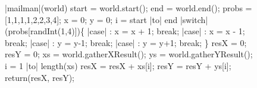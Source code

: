 \documentclass[11pt]{article}
\begin{document}
\begin{figure}[h]
\begin{program}
\PROC |mailman|(world) \BODY
	start = world.start();
	end = world.end();
	probs = [1,1,1,1,2,2,3,4];
	x = 0; y = 0;
	\FOR i = start \; |to| \; end \DO
		|switch|(probs[randInt(1,4)])\{
		|case|   : x = x + 1; break;
		|case|  : x = x - 1; break;
		|case|  : y = y-1; break;
		|case|  : y = y+1; break;
		\}
	\END
	resX = 0; resY = 0;
	xs = world.gatherXResult();
	ys = world.gatherYResult();
	\FOR i = 1 \; |to| \; length(xs) \DO
		resX = resX + xs[i];
		resY = resY + ys[i];
	\END
	return(resX, resY);
\end{program}
\end{figure}
\end{document}

